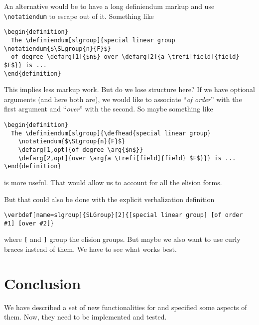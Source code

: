 \documentclass{bluenote}
\def\nlex#1{``\emph{#1}''}
\begin{document}
An alternative would be to have a long definiendum markup and use \lstinline|\notatiendum|
to escape out of it. Something like 
\begin{lstlisting}
\begin{definition}
  The \definiendum[slgroup]{special linear group \notatiendum{$\SLgroup{n}{F}$}
  of degree \defarg[1]{$n$} over \defarg[2]{a \trefi[field]{field} $F$}} is ...
\end{definition}
\end{lstlisting}
This implies less markup work. But do we lose structure here? If we have optional
arguments (and here both are), we would like to associate \nlex{of order} with the first
argument and \nlex{over} with the second. So maybe something like 
\begin{lstlisting}
\begin{definition}
  The \definiendum[slgroup]{\defhead{special linear group} 
    \notatiendum{$\SLgroup{n}{F}$}
    \defarg[1,opt]{of degree \arg{$n$}} 
    \defarg[2,opt]{over \arg{a \trefi[field]{field} $F$}}} is ...
\end{definition}
\end{lstlisting}
is more useful. That would allow us to account for all the elision forms.

But that could also be done with the explicit verbalization definition
\begin{lstlisting}
\verbdef[name=slgroup]{SLGroup}[2]{[special linear group] [of order #1] [over #2]}
\end{lstlisting}
where \lstinline|[| and \lstinline|]| group the elision groups. But maybe we also want to
use curly braces instead of them. We have to see what works best. 


\section{Conclusion}
We have described a set of new functionalities for \sTeX and specified some aspects of
them. Now, they need to be implemented and tested. 

\printbibliography
\end{document}
